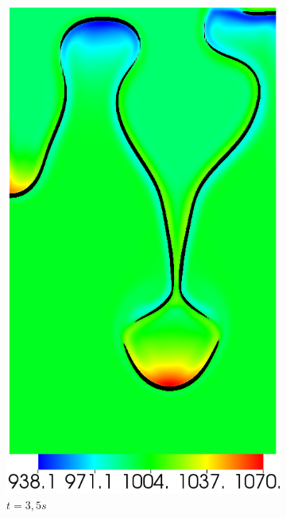 \begin{figure}[H]
	\centering
	\ContinuedFloat
	\begin{subfigure}[ht!]{0.2\textwidth}
		\centering
		\includegraphics[width=1\textwidth]{figure/PT_RT/masse_vol/visit0017.png}
		\caption{$t=3,5s$}
	\end{subfigure}
	\begin{subfigure}[ht!]{0.2\textwidth}
		\centering

\end{subfigure}
\end{figure}
